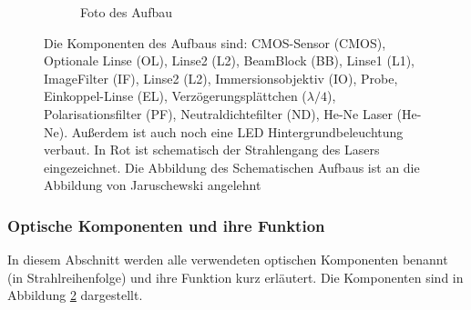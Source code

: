 \documentclass[titlepage]{article}
\begin{document}
\begin{figure}
\begin{subfigure}[b]{0.9\textwidth}
			\caption{Foto des Aufbau}
			\label{fig:aufsicht_aufbau_anotated}
		\end{subfigure}
		\caption{Die Komponenten des Aufbaus sind: CMOS-Sensor (CMOS), Optionale Linse (OL), Linse2 (L2), BeamBlock (BB), Linse1 (L1), ImageFilter (IF), Linse2 (L2), Immersionsobjektiv (IO), Probe, Einkoppel-Linse (EL), Verzögerungsplättchen ($\lambda/4$), Polarisationsfilter (PF), Neutraldichtefilter (ND), He-Ne Laser (He-Ne). Außerdem ist auch noch eine LED Hintergrundbeleuchtung verbaut. In Rot ist schematisch der Strahlengang des Lasers eingezeichnet. Die Abbildung des Schematischen Aufbaus ist an die Abbildung von Jaruschewski \cite{Jaruschewski.2020} angelehnt}
		\label{fig:Aufbau}
	\end{figure}
	\subsubsection{Optische Komponenten und ihre Funktion}
		In diesem Abschnitt werden alle verwendeten optischen Komponenten benannt (in Strahlreihenfolge) und ihre Funktion kurz erläutert. Die Komponenten sind in Abbildung \ref{fig:Aufbau} dargestellt.
\end{document}
